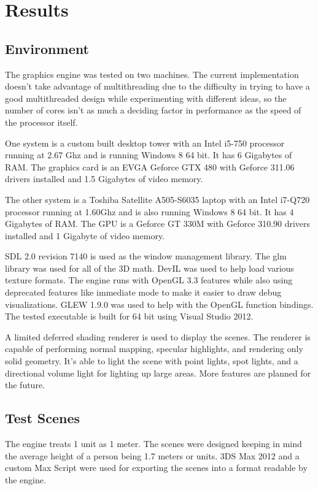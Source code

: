 \documentclass[12pt]{ucthesis}
\begin{document}
\chapter{Results}
\label{results}

\section{Environment}
\label{environment}

The graphics engine was tested on two machines.
The current implementation doesn't take advantage of multithreading due to the difficulty in trying to have a good multithreaded design while experimenting with different ideas, so the number of cores isn't as much a deciding factor in performance as the speed of the processor itself.

One system is a custom built desktop tower with an Intel i5-750 processor running at 2.67 Ghz and is running Windows 8 64 bit.
It has 6 Gigabytes of RAM.
The graphics card is an EVGA Geforce GTX 480 with Geforce 311.06 drivers installed and 1.5 Gigabytes of video memory.

The other system is a Toshiba Satellite A505-S6035 laptop with an Intel i7-Q720 processor running at 1.60Ghz and is also running Windows 8 64 bit.
It has 4 Gigabytes of RAM.
The GPU is a Geforce GT 330M with Geforce 310.90 drivers installed and 1 Gigabyte of video memory.

SDL 2.0 revision 7140 is used as the window management library.
The glm library was used for all of the 3D math.
DevIL was used to help load various texture formats.
The engine runs with OpenGL 3.3 features while also using deprecated features like immediate mode to make it easier to draw debug visualizations.
GLEW 1.9.0 was used to help with the OpenGL function bindings.
The tested executable is built for 64 bit using Visual Studio 2012.

A limited deferred shading renderer is used to display the scenes.
The renderer is capable of performing normal mapping, specular highlights, and rendering only solid geometry.
It's able to light the scene with point lights, spot lights, and a directional volume light for lighting up large areas.
More features are planned for the future.

\section{Test Scenes}
\label{test-scenes}

The engine treats 1 unit as 1 meter.
The scenes were designed keeping in mind the average height of a person being 1.7 meters or units.
3DS Max 2012 and a custom Max Script were used for exporting the scenes into a format readable by the engine.
\end{document}
